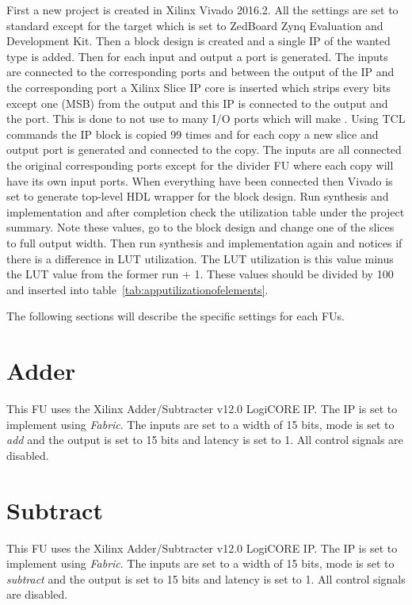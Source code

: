 First a new project is created in Xilinx Vivado 2016.2. All the settings are set to standard except for the target which is set to ZedBoard Zynq Evaluation and Development Kit. Then a block design is created and a single IP of the wanted type is added. Then for each input and output a port is generated. The inputs are connected to the corresponding ports and between the output of the IP and the corresponding port a Xilinx Slice IP core is inserted which strips every bits except one  (MSB) from the output and this IP is connected to the output and the port. This is done to not use to many I/O ports which will make . Using TCL commands the IP block is copied 99 times and for each copy a new slice and output port is generated and connected to the copy. The inputs are all connected the original corresponding ports except for the divider FU where each copy will have its own input ports. When everything have been connected then Vivado is set to generate top-level HDL wrapper for the block design. Run synthesis and implementation and after completion check the utilization table under the project summary. Note these values, go to the block design and change one of the slices to full output width. Then run synthesis and implementation again and notices if there is a difference in LUT utilization. The LUT utilization is this value minus the LUT value from the former run + 1. These values should be divided by 100 and inserted into table~\vref{tab:apputilizationofelements}.

The following sections will describe the specific settings for each FUs. 

\section{Adder}
This FU uses the Xilinx Adder/Subtracter v12.0 LogiCORE IP. The IP is set to implement using \textit{Fabric}. The inputs are set to a width of 15 bits, mode is set to \textit{add} and the output is set to 15 bits and latency is set to 1. All control signals are disabled.

\section{Subtract}
This FU uses the Xilinx Adder/Subtracter v12.0 LogiCORE IP. The IP is set to implement using \textit{Fabric}. The inputs are set to a width of 15 bits, mode is set to \textit{subtract} and the output is set to 15 bits and latency is set to 1. All control signals are disabled.

